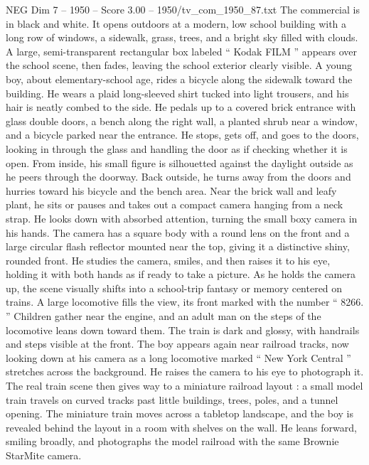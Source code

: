 \begin{textsample}{NEG Dim 7 – 1950 – Score 3.00 – 1950/tv\_com\_1950\_87.txt}  \label{ex:f7_neg_084}
The commercial is in black and white.
It opens outdoors at a modern, low school building with a long row of windows, a sidewalk, grass, trees, and a bright sky filled with clouds.
A large, semi-transparent rectangular box labeled “ Kodak FILM ” appears over the school scene, then fades, leaving the school exterior clearly visible.
A young boy, about elementary-school age, rides a bicycle along the sidewalk toward the building.
He wears a plaid long-sleeved shirt tucked into light trousers, and his hair is neatly combed to the side.
He pedals up to a covered brick entrance with glass double doors, a bench along the right wall, a planted shrub near a window, and a bicycle parked near the entrance.
He stops, gets off, and goes to the doors, looking in through the glass and handling the door as if checking whether it is open.
From inside, his small figure is silhouetted against the daylight outside as he peers through the doorway.
Back outside, he turns away from the doors and hurries toward his bicycle and the bench area.
Near the brick wall and leafy plant, he sits or pauses and takes out a compact camera hanging from a neck strap.
He looks down with absorbed attention, turning the small boxy camera in his hands.
The camera has a square body with a round lens on the front and a large circular flash reflector mounted near the top, giving it a distinctive shiny, rounded front.
He studies the camera, smiles, and then raises it to his eye, holding it with both hands as if ready to take a picture.
As he holds the camera up, the scene visually shifts into a school-trip fantasy or memory centered on trains.
A large locomotive fills the view, its front marked with the number “ 8266. ” Children gather near the engine, and an adult man on the steps of the locomotive leans down toward them.
The train is dark and glossy, with handrails and steps visible at the front.
The boy appears again near railroad tracks, now looking down at his camera as a long locomotive marked “ New York Central ” stretches across the background.
He raises the camera to his eye to photograph it.
The real train scene then gives way to a miniature railroad layout : a small model train travels on curved tracks past little buildings, trees, poles, and a tunnel opening.
The miniature train moves across a tabletop landscape, and the boy is revealed behind the layout in a room with shelves on the wall.
He leans forward, smiling broadly, and photographs the model railroad with the same Brownie StarMite camera.

\end{textsample}
